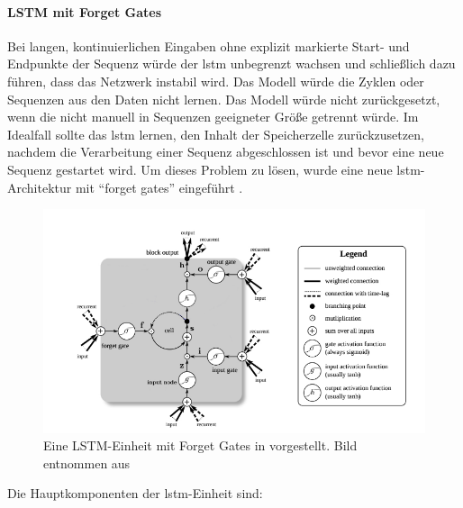 \documentclass[
        ngerman,
        paper=a4,
        numbers=noendperiod,
]{scrreprt}
\begin{document}
\paragraph{LSTM mit Forget Gates}

Bei langen, kontinuierlichen Eingaben ohne explizit markierte Start- und Endpunkte der Sequenz würde der \ac{lstm} unbegrenzt wachsen und schließlich dazu führen, dass das Netzwerk instabil wird. Das Modell würde die Zyklen oder Sequenzen aus den Daten nicht lernen. Das Modell würde nicht zurückgesetzt, wenn die nicht manuell in Sequenzen geeigneter Größe getrennt würde. Im Idealfall sollte das \ac{lstm} lernen, den Inhalt der Speicherzelle zurückzusetzen, nachdem die Verarbeitung einer Sequenz abgeschlossen ist und bevor eine neue Sequenz gestartet wird. Um dieses Problem zu lösen, wurde eine neue \ac{lstm}-Architektur mit \enquote{forget gates} eingeführt \cite{Cummins2000ArticleComputation}.

\begin{figure}[H]
    \centering\includegraphics[width=1\linewidth]{images/lstm.png}
    \caption[Das Perceptron-Lernmodell]{Eine LSTM-Einheit mit Forget Gates in \cite{Cummins2000ArticleComputation} vorgestellt. Bild entnommen aus \citep{Greff2015TRANSACTIONSOdyssey}}
    \label{fig:lstm}
\end{figure}

Die Hauptkomponenten der \ac{lstm}-Einheit sind:
\end{document}
